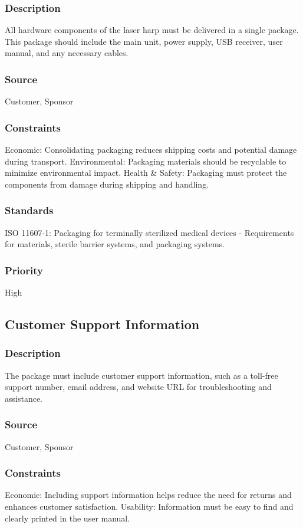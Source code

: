 \subsubsection{Description}
All hardware components of the laser harp must be delivered in a single package. This package should include the main unit, power supply, USB receiver, user manual, and any necessary cables.
\subsubsection{Source}
Customer, Sponsor
\subsubsection{Constraints}
Economic: Consolidating packaging reduces shipping costs and potential damage during transport.
Environmental: Packaging materials should be recyclable to minimize environmental impact.
Health & Safety: Packaging must protect the components from damage during shipping and handling.
\subsubsection{Standards}
ISO 11607-1: Packaging for terminally sterilized medical devices - Requirements for materials, sterile barrier systems, and packaging systems.
\subsubsection{Priority}
High


\subsection{Customer Support Information}
\subsubsection{Description}
The package must include customer support information, such as a toll-free support number, email address, and website URL for troubleshooting and assistance.
\subsubsection{Source}
Customer, Sponsor
\subsubsection{Constraints}
Economic: Including support information helps reduce the need for returns and enhances customer satisfaction.
Usability: Information must be easy to find and clearly printed in the user manual.
